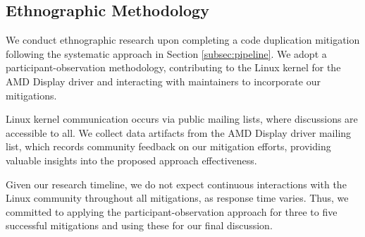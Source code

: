 \subsection{Ethnographic Methodology}

We conduct ethnographic research upon completing a code duplication mitigation following the systematic approach in Section \ref{subsec:pipeline}. We adopt a participant-observation methodology, contributing to the Linux kernel for the AMD Display driver and interacting with maintainers to incorporate our mitigations.

Linux kernel communication occurs via public mailing lists, where discussions are accessible to all. We collect data artifacts from the AMD Display driver mailing list, which records community feedback on our mitigation efforts, providing valuable insights into the proposed approach effectiveness.

Given our research timeline, we do not expect continuous interactions with the Linux community throughout all mitigations, as response time varies. Thus, we committed to applying the participant-observation approach for three to five successful mitigations and using these for our final discussion.
